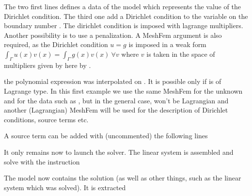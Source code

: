 \documentclass[a4paper,11pt,english]{sphinxmanual}
\begin{document}
The two first lines defines a data of the model which represents the value of the
Dirichlet condition. The third one add a Dirichlet condition to the variable 
on the boundary number . The dirichlet condition is imposed with lagrange
multipliers. Another possibility is to use a penalization. A MeshFem argument is
also required, as the Dirichlet condition \(u=g\) is imposed in a weak form
\(\int_\Gamma u(x)v(x) = \int_\Gamma g(x)v(x)\ \forall v\) where \(v\) is
taken in the space of multipliers given by here by .

\begin{sphinxShadowBox}

the polynomial expression was interpolated on . It is possible only if
 is of Lagrange type. In this first example we use the same MeshFem for
the unknown and for the data such as , but in the general case, 
won’t be Lagrangian and another (Lagrangian) MeshFem will be used for the
description of Dirichlet conditions, source terms etc.
\end{sphinxShadowBox}

A source term can be added with (uncommented) the following lines

\begin{sphinxVerbatim}[commandchars=\\\{\},numbers=left,firstnumber=1,stepnumber=1]

\end{sphinxVerbatim}

It only remains now to launch the solver. The linear system is assembled and solve
with the instruction

\begin{sphinxVerbatim}[commandchars=\\\{\},numbers=left,firstnumber=1,stepnumber=1]

\end{sphinxVerbatim}

The model now contains the solution (as well as other things, such as the linear
system which was solved). It is extracted
\end{document}
